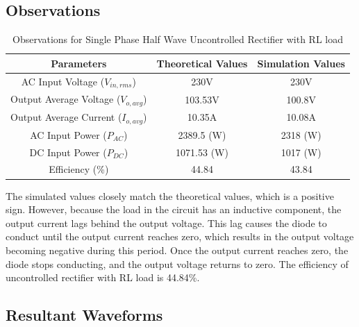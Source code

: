 \subsection{Observations}

\begin{table}[h]
    \renewcommand{\arraystretch}{1.3}
    \label{table_observation_2}
    \centering
    \begin{tabular}{|c|c|c|}
        \hline
        Parameters                              & Theoretical Values & Simulation Values \\
        \hline
        \hline
        AC Input Voltage ($ V_{in,rms} $)       & 230V               & 230V              \\
        \hline
        Output Average Voltage ($ V_{o,avg} $)  & 103.53V            & 100.8V            \\
        \hline
        Output Average Current ($ I_{o,avg}  $) & 10.35A             & 10.08A            \\
        \hline
        AC Input Power ($ P_{AC} $)             & 2389.5 (W)         & 2318 (W)          \\
        \hline
        DC Input Power ($ P_{DC} $)             & 1071.53 (W)        & 1017 (W)          \\
        \hline
        Efficiency (\%)                         & 44.84              & 43.84             \\
        \hline
    \end{tabular}
    \caption{Observations for Single Phase Half Wave Uncontrolled Rectifier with RL load}

\end{table}


 The simulated values closely match the theoretical values, which is a positive sign. However, because the load in the circuit has an inductive component, the output current lags behind the output voltage. This lag causes the diode to conduct until the output current reaches zero, which results in the output voltage becoming negative during this period. Once the output current reaches zero, the diode stops conducting, and the output voltage returns to zero.
The efficiency of uncontrolled rectifier with RL load is 44.84\%.
\pagebreak


\subsection{Resultant Waveforms}

